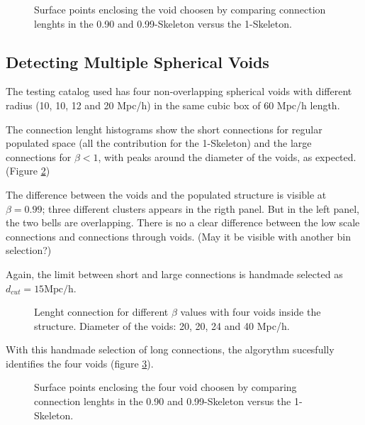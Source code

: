 \documentclass[preprint]{aastex62}
\begin{document}
\begin{figure}
  \caption{Surface points enclosing the void choosen by comparing
    connection lenghts in the 0.90 and 0.99-Skeleton versus the
    1-Skeleton.
    \label{3d_scatter_single_void}}
\end{figure}

\subsection{Detecting Multiple Spherical Voids}

The testing catalog used has four non-overlapping spherical voids
with different radius (10, 10, 12 and 20 Mpc/h) in the same cubic box
of 60 Mpc/h length.

The connection lenght histograms show the short connections for
regular populated space (all the contribution for the 1-Skeleton)
and the large connections for $\beta<1$, with peaks around the
diameter of the voids, as expected.
(Figure \ref{Fig_Length_connection_4V})

The difference between the voids and the populated structure is visible
at $\beta=0.99$; three different clusters appears in the rigth panel.
But in the left panel, the two bells are overlapping. There is no a
clear difference between the low scale connections and connections
through voids. (May it be visible with another bin selection?)

Again, the limit between short and large connections is handmade
selected as $d_{cut} = 15 \mathrm{Mpc/h}$. 

\begin{figure}
  \caption{Lenght connection for different $\beta$ values with four
    voids inside the structure. Diameter of the voids: 20, 20, 24 and 40
    Mpc/h.
    \label{Fig_Length_connection_4V}}
\end{figure}

With this handmade selection of long connections, the algorythm sucesfully
identifies the four voids (figure \ref{3d_scatter_four_voids}).

\begin{figure}
  \caption{Surface points enclosing the four void choosen by comparing
    connection lenghts in the 0.90 and 0.99-Skeleton versus the
    1-Skeleton.
    \label{3d_scatter_four_voids}}
\end{figure}
\end{document}
